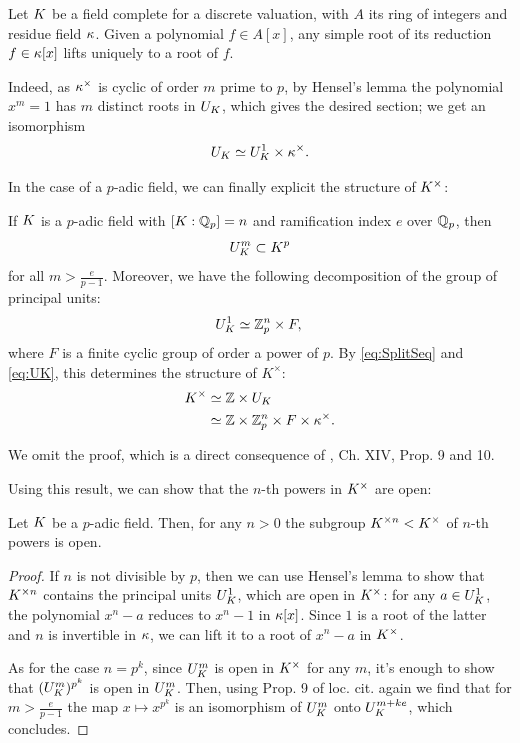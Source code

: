 \documentclass[a4paper, oneside]{memoir}
\begin{document}
\begin{proposition}
	Let $K$ be a field complete for a discrete valuation, with $A$ its ring of integers and residue field $\kappa$.
	Given a polynomial $f\in A[x]$, any simple root of its reduction $f\in \kappa[x]$ lifts uniquely to a root of $f$.
\end{proposition}

Indeed, as $\kappa^\times$ is cyclic of order $m$ prime to $p$, by Hensel's lemma the polynomial $x^m=1$ has $m$ distinct roots in $U_K$, which gives the desired section; we get an isomorphism
\begin{equation}\label{eq:UK}
	U_K\simeq U_K^1\times\kappa^\times.
\end{equation}

In the case of a $p$-adic field, we can finally explicit the structure of $K^\times$:

\begin{theorem}\label{thm:StructureLocalFields}
	If $K$ is a $p$-adic field with $[K:\mathbb{Q}_p]=n$ and ramification index $e$ over $\mathbb{Q}_p$, then
	\[
		U_K^m \subset K^p
	\]
	for all $m> \frac{e}{p-1}$. Moreover, we have the following decomposition of the group of principal units:
	\begin{equation*}
		U_K^1 \simeq \mathbb{Z}_p^n \times F, \\
	\end{equation*}
	where $F$ is a finite cyclic group of order a power of $p$.
	By \eqref{eq:SplitSeq} and \eqref{eq:UK}, this determines the structure of $K^\times$:
	\begin{align*}
		K^\times & \simeq \mathbb{Z} \times U_K                             \\
		          & \simeq \mathbb{Z} \times \mathbb{Z}_p^n \times F \times \kappa^\times.
	\end{align*}
\end{theorem}
\noindent We omit the proof, which is a direct consequence of \cite{SerreCL}, Ch. XIV, Prop. 9 and 10.

Using this result, we can show that the $n$-th powers in $K^\times$ are open:
\begin{corollary}\label{cor:KxOpen}
	Let $K$ be a $p$-adic field. Then, for any $n>0$ the subgroup $K^{\times n}<K^\times$ of $n$-th powers is open.
\end{corollary}
\begin{proof}
	If $n$ is not divisible by $p$, then we can use Hensel's lemma to show that $K^{\times n}$ contains the principal units $U_K^1$, which are open in $K^\times$: for any $a\in U_K^1$, the polynomial $x^n-a$ reduces to $x^{n} - 1$ in $\kappa[x]$. Since $1$ is a root of the latter and $n$ is invertible in $\kappa$, we can lift it to a root of $x^n-a$ in $K^\times$.

	As for the case $n=p^k$, since $U_K^m$ is open in $K^\times$ for any $m$, it's enough to show that $(U_K^m)^{p^k}$ is open in $U_K^m$.
	Then, using Prop. 9 of loc. cit. again we find that for $m>\frac{e}{p-1}$ the map $x\mapsto x^{p^k}$ is an isomorphism of $U_K^m$ onto $U_K^{m+ke}$, which concludes.
\end{proof}
\end{document}
